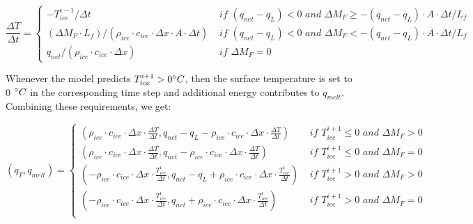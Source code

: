 \documentclass[utf8]{frontiersSCNS} %
\begin{document}
\begin{equation} \frac{\Delta T}{\Delta t} = \left\{ \begin{array}{ll} -T_{ice}^{i-1}/\Delta t & \textit{ if }
    (q_{net}-q_{L}) < 0 \textit{ and } \Delta M_{F} \geq -(q_{net}-q_{L})\cdot A \cdot \Delta t/L_f  \\ (\Delta M_{F}
    \cdot L_f )/(\rho_{ice} \cdot c_{ice} \cdot  \Delta x \cdot A \cdot \Delta t) & \textit{ if } (q_{net}-q_{L}) < 0
    \textit{ and } \Delta M_{F} < -(q_{net}-q_{L})\cdot A \cdot \Delta t/L_f  \\ q_{net}/ (\rho_{ice}\cdot c_{ice} \cdot
    \Delta x)& \textit{ if } \Delta M_{F} = 0
         
    \end{array} \right.  \label{eqn:T} \end{equation}

Whenever the model predicts $T_{ice}^{i+1} > 0 \degree C$, then the surface temperature is set to 0 $\degree C$ in the
corresponding time step and additional energy contributes to $q_{melt}$. Combining these requirements, we get:

\begin{equation} (q_{T}, q_{melt}) = \left\{ \begin{array}{ll} ( \rho_{ice} \cdot c_{ice} \cdot  \Delta x \cdot
    \frac{\Delta T}{\Delta t}, q_{net}-q_{L}-\rho_{ice} \cdot c_{ice} \cdot  \Delta x \cdot \frac{\Delta T}{\Delta t}) &
    \textit{ if } T_{ice}^{i+1}\leq 0 \textit{ and } \Delta M_{F} > 0\\ ( \rho_{ice} \cdot c_{ice} \cdot  \Delta x \cdot
    \frac{\Delta T}{\Delta t}, q_{net}-\rho_{ice} \cdot c_{ice} \cdot  \Delta x \cdot \frac{\Delta T}{\Delta t}) &
    \textit{ if } T_{ice}^{i+1}\leq 0 \textit{ and } \Delta M_{F} = 0\\
        ( -\rho_{ice} \cdot c_{ice} \cdot  \Delta x \cdot \frac{T_{ice}^{i}}{\Delta t}, q_{net}-q_{L}+\rho_{ice} \cdot
        c_{ice} \cdot \Delta x \cdot \frac{T_{ice}^{i}}{\Delta t}) & \textit{ if } T_{ice}^{i+1}> 0 \textit{ and }
        \Delta M_{F} > 0\\ ( -\rho_{ice} \cdot c_{ice} \cdot  \Delta x \cdot \frac{T_{ice}^{i}}{\Delta t},
        q_{net}+\rho_{ice} \cdot c_{ice} \cdot  \Delta x \cdot \frac{T_{ice}^{i}}{\Delta t}) & \textit{ if }
    T_{ice}^{i+1}> 0 \textit{ and } \Delta M_{F} = 0\\ \end{array} \right.  \label{eqn:qt} \end{equation}
\end{document}

